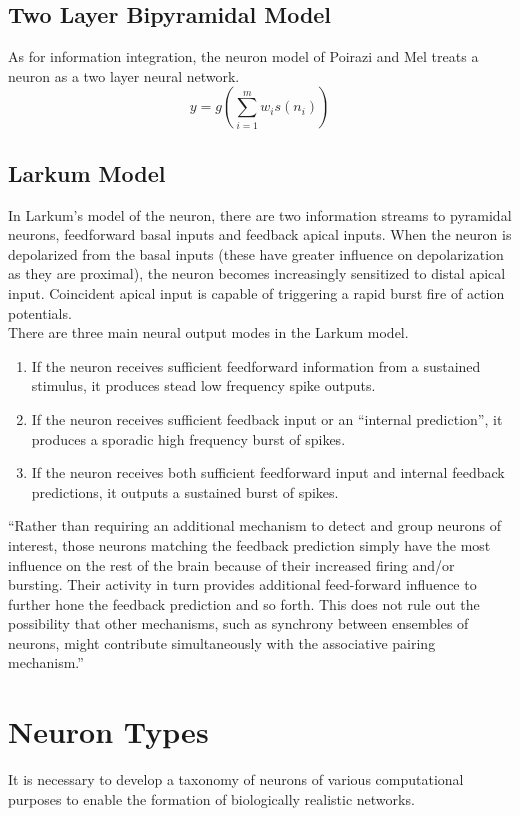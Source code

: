 \documentclass[11pt, a4paper]{article}
\begin{document}
\subsection{Two Layer Bipyramidal Model}
As for information integration, the neuron model of Poirazi and Mel treats a neuron as a two layer neural network. 
\begin{equation}
    y  =g \left(\sum_{i=1}^m w_i s(n_i) \right)
\end{equation}

\subsection{Larkum Model}
In Larkum's model of the neuron, there are two information streams to pyramidal neurons, feedforward basal inputs and feedback apical inputs. When the neuron is depolarized from the basal inputs (these have greater influence on depolarization as they are proximal), the neuron becomes increasingly sensitized to distal apical input. Coincident apical input is capable of triggering a rapid burst fire of action potentials. \\

There are three main neural output modes in the Larkum model.
\begin{enumerate}
    \item If the neuron receives sufficient feedforward information from a sustained stimulus, it produces stead low frequency spike outputs.
    \item If the neuron receives sufficient feedback input or an ``internal prediction'', it produces a sporadic high frequency burst of spikes.
    \item If the neuron receives both sufficient feedforward input and internal feedback predictions, it outputs a sustained burst of spikes.
\end{enumerate}

``Rather than requiring an additional mechanism to detect and group neurons of interest, those neurons matching the feedback prediction simply have the most influence on the rest of the brain because of their increased firing and/or bursting. Their activity in turn provides additional feed-forward influence to further hone the feedback prediction and so forth. This does not rule out the possibility that other mechanisms, such as synchrony between ensembles of
neurons, might contribute simultaneously with the associative pairing  mechanism.''


\section{Neuron Types}
It is necessary to develop a taxonomy of neurons of various computational purposes to enable the formation of biologically realistic networks.
\end{document}
